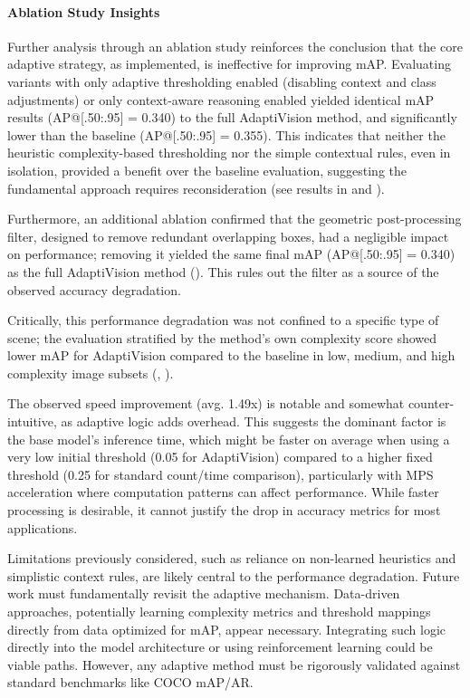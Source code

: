 \documentclass{article}
\begin{document}
{\sloppy %
\paragraph{Ablation Study Insights} Further analysis through an ablation study reinforces the conclusion that the core adaptive strategy, as implemented, is ineffective for improving mAP. Evaluating variants with only adaptive thresholding enabled (disabling context and class adjustments) or only context-aware reasoning enabled yielded identical mAP results (AP@[.50:.95] = 0.340) to the full AdaptiVision method, and significantly lower than the baseline (AP@[.50:.95] = 0.355). This indicates that neither the heuristic complexity-based thresholding nor the simple contextual rules, even in isolation, provided a benefit over the baseline evaluation, suggesting the fundamental approach requires reconsideration (see results in  and ).

Furthermore, an additional ablation confirmed that the geometric post-processing filter, designed to remove redundant overlapping boxes, had a negligible impact on performance; removing it yielded the same final mAP (AP@[.50:.95] = 0.340) as the full AdaptiVision method (). This rules out the filter as a source of the observed accuracy degradation.

Critically, this performance degradation was not confined to a specific type of scene; the evaluation stratified by the method's own complexity score showed lower mAP for AdaptiVision compared to the baseline in low, medium, and high complexity image subsets (, ).

The observed speed improvement (avg. 1.49x) is notable and somewhat counter-intuitive, as adaptive logic adds overhead. This suggests the dominant factor is the base model's inference time, which might be faster on average when using a very low initial threshold (0.05 for AdaptiVision) compared to a higher fixed threshold (0.25 for standard count/time comparison), particularly with MPS acceleration where computation patterns can affect performance. While faster processing is desirable, it cannot justify the drop in accuracy metrics for most applications.

Limitations previously considered, such as reliance on non-learned heuristics and simplistic context rules, are likely central to the performance degradation. Future work must fundamentally revisit the adaptive mechanism. Data-driven approaches, potentially learning complexity metrics and threshold mappings directly from data optimized for mAP, appear necessary. Integrating such logic directly into the model architecture or using reinforcement learning could be viable paths. However, any adaptive method must be rigorously validated against standard benchmarks like COCO mAP/AR.

} %
\end{document}
